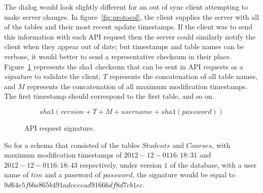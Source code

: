 The dialog would look slightly different for an out of sync client attempting to
make server changes. In figure~\ref{fig:protocol}, the client supplies the
server with all of the tables and their most recent update timestamps. If the
client was to send this information with each API request then the server could
similarly notify the client when they appear out of date; but timestamps and
table names can be verbose, it would better to send a representative checksum in
their place. Figure~\ref{fig:signature} represents the sha1 checksum that can be
sent in API requests as a \textit{signature} to validate the client; $T$
represents the concatenation of all table names, and $M$ represents the
concatenation of all maximum modification timestamps. The first timestamp should
correspond to the first table, and so on.

\begin{figure}[h!]
\[
sha1(version + T + M + username + sha1(password))
\]
\caption{API request signature.}
\label{fig:signature}
\end{figure}

So for a schema that consisted of the tables $Students$ and $Courses$, with
maximum modification timestamps of $2012-12-01 16:18:31$ and
$2012-12-01 16:18:43$ respectively, under version $1$ of the database, with a
user name of $tim$ and a password of $password$, the signature would be
equal to \hbox{$9d64e5fbba865b491adeeeead91666df8d7cb1ec$}.




